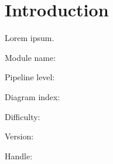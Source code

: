 \documentclass[MS]{spherex}
\begin{document}
\maketitle

\section{Introduction}

Lorem ipsum. \cite{SPHEREx_SPIE}

Module name: \themodulename

Pipeline level: \thepipelevel

Diagram index: \thediagramindex

Difficulty: \thedifficulty

Version: \theversion

Handle: \thehandle


\end{document}
